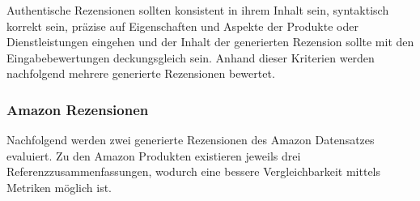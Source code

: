 Authentische Rezensionen sollten konsistent in ihrem Inhalt sein, syntaktisch korrekt sein, präzise auf Eigenschaften und Aspekte der Produkte oder Dienstleistungen eingehen und der Inhalt der generierten Rezension sollte mit den Eingabebewertungen deck\-ungs\-gleich sein.
Anhand dieser Kriterien werden nachfolgend mehrere generierte Rezensionen bewertet.


\setlength{\fboxsep}{0.7em}

\subsubsection{Amazon Rezensionen}

Nachfolgend werden zwei generierte Rezensionen des Amazon Datensatzes evaluiert. Zu den Amazon Produkten existieren jeweils drei Referenzzusammenfassungen, wodurch eine bessere Vergleichbarkeit mittels Metriken möglich ist.

